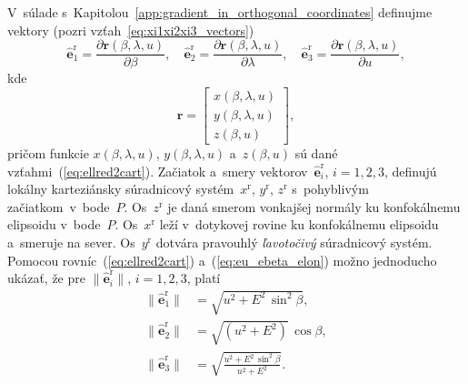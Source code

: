 \documentclass[a4paper,12pt]{book}
\let\vec\mathbf
\begin{document}
V~súlade s~Kapitolou~\ref{app:gradient_in_orthogonal_coordinates} definujme 
vektory (pozri vzťah~\ref{eq:xi1xi2xi3_vectors})
%
\begin{equation}
\label{eq:eu_ebeta_elon}
\hat{\vec e}_1^\mathrm{r} = \frac{\partial \vec r(\beta, \lambda, u)}{\partial 
\beta}{,}
%
\quad
%
\hat{\vec e}_2^\mathrm{r} = \frac{\partial \vec r(\beta, \lambda, u)}{\partial 
\lambda}{,}
%
\quad
%
\hat{\vec e}_3^\mathrm{r} = \frac{\partial \vec r(\beta, \lambda, u)}{\partial 
u}{,}
%
\end{equation}
%
kde
%
\begin{equation}
\vec r =
%
\begin{bmatrix}
x(\beta, \lambda, u)\\
y(\beta, \lambda, u)\\
z(\beta, u)
\end{bmatrix}
{,}
%
\end{equation}
%
pričom funkcie $x(\beta, \lambda, u)$, $y(\beta, \lambda, u)$ a~$z(\beta, u)$ 
sú dané vzťahmi~(\ref{eq:ellred2cart}).  Začiatok a~smery vektorov~$\hat{\vec 
e}_i^\mathrm{r}$, $i = 1, 2, 3$, definujú lokálny karteziánsky súradnicový 
systém~$x^\mathrm{r}$, $y^\mathrm{r}$, $z^\mathrm{r}$ s~pohyblivým 
začiatkom~v~bode~$P$.  Os~$z^\mathrm{r}$ je daná smerom vonkajšej normály ku 
konfokálnemu elipsoidu v~bode~$P$.  Os~$x^\mathrm{r}$ leží v~dotykovej rovine 
ku konfokálnemu elipsoidu a~smeruje na sever.  Os~$y^\mathrm{r}$ dotvára 
pravouhlý \emph{ľavotočivý} súradnicový systém.
%
Pomocou rovníc~(\ref{eq:ellred2cart}) a~(\ref{eq:eu_ebeta_elon}) možno 
jednoducho ukázať, že pre $\| \hat{\vec e}_i^\mathrm{r} \|$, $i = 1, 2, 3$, 
platí
%
\begin{equation}
\label{eq:ei_reduced_ell_magnitudes}
\begin{split}
\| \hat{\vec e}_1^\mathrm{r} \| &= \sqrt{u^2 + E^2 \, \sin^2\beta}{,}\\
%
\| \hat{\vec e}_2^\mathrm{r} \| &= \sqrt{\left( u^2 + E^2 \right)} \, 
\cos\beta{,}\\
%
\| \hat{\vec e}_3^\mathrm{r} \| &= \sqrt{\frac{u^2 + E^2 \, \sin^2\beta}{u^2 
+ E^2}}{.}
\end{split}
\end{equation}
\end{document}
